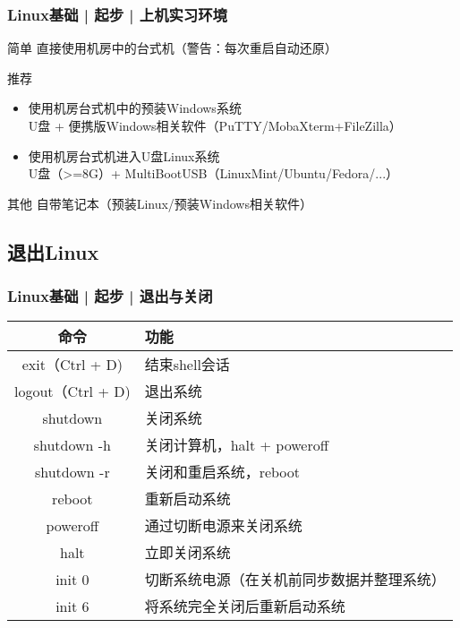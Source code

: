 \begin{frame}
  \frametitle{Linux基础 | 起步 | 上机实习环境}
  \begin{block}{简单}
    直接使用机房中的台式机（\alert{警告：每次重启自动还原}）
  \end{block}
  \pause
  \begin{block}{推荐}
    \begin{itemize}
      \item 使用机房台式机中的预装Windows系统\\ \quad U盘 + 便携版Windows相关软件（PuTTY/MobaXterm+FileZilla）
      \item 使用机房台式机进入U盘Linux系统\\ \quad U盘（>=8G）+ MultiBootUSB（LinuxMint/Ubuntu/Fedora/...）
    \end{itemize}
  \end{block}
  \pause
  \begin{block}{其他}
    自带笔记本（预装Linux/预装Windows相关软件）
  \end{block}
\end{frame}

\subsection{退出Linux}
\begin{frame}
  \frametitle{Linux基础 | 起步 | 退出与关闭}
  \begin{table}
    \centering
    \begin{tabular}{cl}
      \hline
      \rowcolor{blue!50}命令 & 功能\\
      \hline
      exit（Ctrl + D) & 结束shell会话\\
      logout（Ctrl + D) & 退出系统\\
      \hline
      shutdown & 关闭系统\\
      \alert{shutdown -h} & 关闭计算机，halt + poweroff\\
      shutdown -r & 关闭和重启系统，reboot\\
      \alert{reboot} & 重新启动系统\\
      poweroff & 通过切断电源来关闭系统\\
      halt & 立即关闭系统\\
      init 0 & 切断系统电源（在关机前同步数据并整理系统）\\
      init 6 & 将系统完全关闭后重新启动系统\\
      \hline
    \end{tabular}
  \end{table}
\end{frame}

